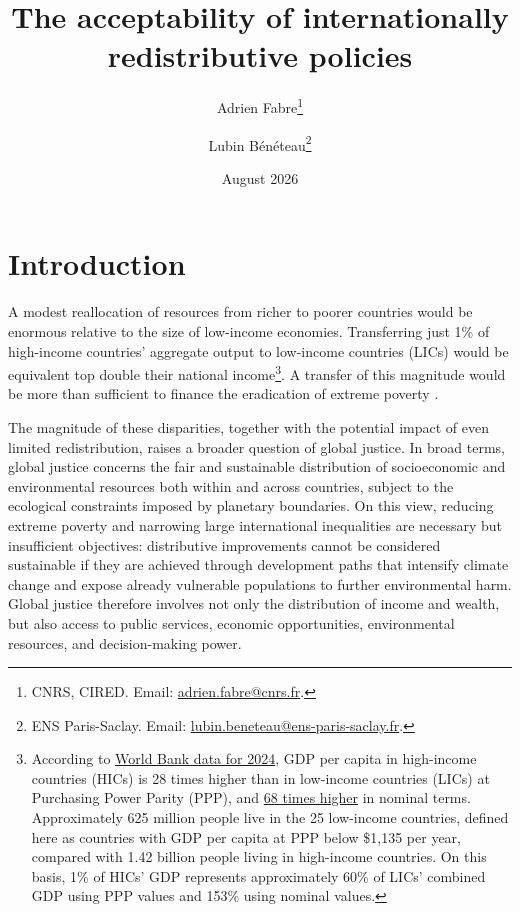 \documentclass[11pt,a4paper]{article}
\title{\textbf{The acceptability of internationally redistributive policies}}
\author{
    Adrien Fabre\thanks{
        CNRS, CIRED.
        Email: \href{mailto:adrien.fabre@cnrs.fr}
        {adrien.fabre@cnrs.fr}.
    }
    \and
    Lubin Bénéteau\thanks{
        ENS Paris-Saclay. 
        Email: \href{mailto:lubin.beneteau@ens-paris-saclay.fr}
        {lubin.beneteau@ens-paris-saclay.fr}.
    }
}
\date{August 2026}
\begin{document}
\maketitle
\setcounter{footnote}{0}


\section*{Introduction}

A modest reallocation of resources from richer to poorer countries would be enormous relative to the size of low-income economies. Transferring just 1\% of high-income countries' aggregate output to low-income countries (LICs) would be equivalent top double their national income\footnote{According to \href{https://data.worldbank.org/indicator/NY.GDP.PCAP.PP.CD?contextual=default&end=2024&locations=EU-ZG-XD-XM-1W-IN-US-CD-BI-LU-CN&start=2024&view=bar}{World Bank data for 2024}, GDP per capita in high-income countries (HICs) is 28 times higher than in low-income countries (LICs) at Purchasing Power Parity (PPP), and \href{https://data.worldbank.org/indicator/NY.GDP.PCAP.CD?end=2024&locations=EU-ZG-XD-XM-1W-IN-US-CD-BI-LU-CN&start=2024&view=bar}{68 times higher} in nominal terms. Approximately 625 million people live in the 25 low-income countries, defined here as countries with GDP per capita at PPP below \$1,135 per year, compared with 1.42 billion people living in high-income countries. On this basis, 1\% of HICs' GDP represents approximately 60\% of LICs' combined GDP using PPP values and 153\% using nominal values.}. A transfer of this magnitude would be more than sufficient to finance the eradication of extreme poverty \citep{sahoo_what_2025}.

The magnitude of these disparities, together with the potential impact of even limited redistribution, raises a broader question of global justice. In broad terms, global justice concerns the fair and sustainable distribution of socioeconomic and environmental resources both within and across countries, subject to the ecological constraints imposed by planetary boundaries. On this view, reducing extreme poverty and narrowing large international inequalities are necessary but insufficient objectives: distributive improvements cannot be considered sustainable if they are achieved through development paths that intensify climate change and expose already vulnerable populations to further environmental harm. Global justice therefore involves not only the distribution of income and wealth, but also access to public services, economic opportunities, environmental resources, and decision-making power.
\end{document}

